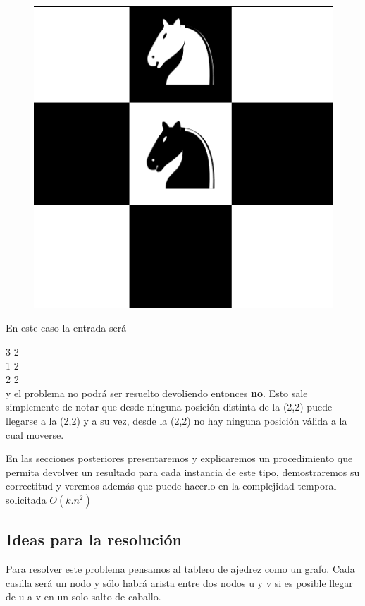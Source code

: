 \documentclass[11pt, a4paper, twoside]{article}
\begin{document}
\begin{figure}[H]
\centering
\includegraphics[scale=0.35]{imagenes/chess-nosol.jpg}
\caption{}
\end{figure} 

En este caso la entrada será

3 2\\
1 2\\
2 2\\

y el problema no podrá ser resuelto devoliendo entonces \textbf{no}. Esto sale simplemente de notar que desde ninguna posición distinta de la (2,2) puede llegarse a la (2,2) y a su vez, desde la (2,2) no hay ninguna posición válida a la cual moverse.

En las secciones posteriores presentaremos y explicaremos un procedimiento que permita devolver un resultado para cada instancia de este tipo, demostraremos su correctitud y veremos además que puede hacerlo en la complejidad temporal solicitada $O(k.n^2)$

\subsection{Ideas para la resolución}

Para resolver este problema pensamos al tablero de ajedrez como un grafo. Cada casilla será un nodo y sólo habrá arista entre dos nodos u y v si es posible llegar de u a v en un solo salto de caballo.
\end{document}
